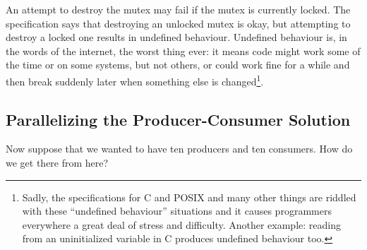 An attempt to destroy the mutex may fail if the mutex is currently locked. The specification says that destroying an unlocked mutex is okay, but attempting to destroy a locked one results in undefined behaviour. Undefined behaviour is, in the words of the internet, the worst thing ever: it means code might work some of the time or on some systems, but not others, or could work fine for a while and then break suddenly later when something else is changed\footnote{Sadly, the specifications for C and POSIX and many other things are riddled with these ``undefined behaviour'' situations and it causes programmers everywhere a great deal of stress and difficulty. Another example: reading from an uninitialized variable in C produces undefined behaviour too.}.

\subsection*{Parallelizing the Producer-Consumer Solution}
Now suppose that we wanted to have ten producers and ten consumers. How do we get there from here?

